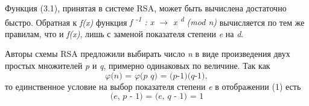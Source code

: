  Функция (3.1), принятая в системе RSA, может быть вычислена достаточно быстро. Обратная к \textit{f(x)} функция 
\textit{f\textsuperscript{ -1} : x {$\rightarrow$} x\textsuperscript{ d} (mod n) } вычисляется по тем же правилам, что и \textit{f(x)}, 
лишь с заменой показателя степени \textit{e} на \textit{d}.
\begin{comment}
  Для вычисления функции (3.1) достаточно знать лишь числа \textit{e} и \textit{n}. Именно они составляют открытый ключ для шифрования. 
А вот для вычисления обратной функции требуется знать число \textit{d}. Казалось бы, ничего не стоит, зная число \textit{n}, разложить 
его на простые сомножители, вычислить затем с помощью известных правил значение \textit{{$\varphi$}(n)} и, наконец, с помощью (3.3) определить 
нужное число \textit{d}. Все шаги этого вычисления могут быть реализованы достаточно быстро, за исключением первого. Именно разложение числа \textit{n} на 
простые множители и составляет наиболее трудоемкую часть вычислений. В теории чисел несмотря на многолетнюю её историю и на очень интенсивные поиски в течение последних 20 лет, 
эффективный алгоритм разложения натуральных чисел на множители так и не найден.
\end{comment}
  Авторы схемы RSA предложили выбирать число \textit{n} в виде произведения двух простых множителей \textit{p} и \textit{q}, примерно одинаковых по 
величине. Так как 
\begin{equation}
 \textit{{$\varphi$}(n) = {$\varphi$}(p q) = (p-1)(q-1)},
\end{equation}
то единственное условие на выбор показателя степени \textit{e} в отображении (1) есть
\begin{equation}
 \textit{(e, p - 1) = (e, q - 1) = 1}
\end{equation}

